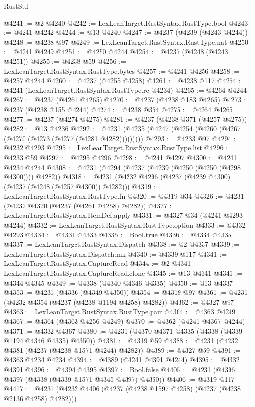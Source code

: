 \begin{lexlean}{RustStd}
\begin{coremodule}
@4241 := @2 @4240
@4242 := LexLeanTarget.RustSyntax.RustType.bool
@4243 := @4241 @4242
@4244 := @13 @4240
@4247 := @4237 (@4239 (@4243 @4244))
@4248 := @4238 @97
@4249 := LexLeanTarget.RustSyntax.RustType.nat
@4250 := @4241 @4249
@4251 := @4250 @4244
@4254 := @4237 (@4248 (@4243 @4251))
@4255 := @4238 @59
@4256 := LexLeanTarget.RustSyntax.RustType.bytes
@4257 := @4241 @4256
@4258 := @4257 @4244
@4260 := @4237 (@4255 @4258)
@4261 := @4238 @117
@4264 := @4241 (LexLeanTarget.RustSyntax.RustType.rc @4234)
@4265 := @4264 @4244
@4267 := @4237 (@4261 @4265)
@4270 := @4237 (@4238 @183 @4265)
@4273 := @4237 (@4238 @155 @4244)
@4274 := @4238 @364
@4275 := @4264 @4265
@4277 := @4237 (@4274 @4275)
@4281 := @4237 (@4238 @371 (@4257 @4275))
@4282 := @13 @4236
@4292 := @4231 (@4235 (@4247 (@4254 (@4260 (@4267 (@4270 (@4273 (@4277 (@4281 @4282)))))))))
@4293 := @4233 @97
@4294 := @4232 @4293
@4295 := LexLeanTarget.RustSyntax.RustType.list
@4296 := @4233 @59
@4297 := @4295 @4296
@4298 := @4241 @4297
@4300 := @4241 @4234 @4244
@4308 := @4231 (@4294 (@4237 (@4239 (@4250 (@4250 (@4298 @4300)))) @4282))
@4318 := @4231 (@4232 @4296 (@4237 (@4239 @4300) (@4237 (@4248 (@4257 @4300)) @4282)))
@4319 := LexLeanTarget.RustSyntax.RustType.fn
@4320 := @4319 @34
@4326 := @4231 (@4232 @4320 (@4237 (@4261 @4258) @4282))
@4327 := LexLeanTarget.RustSyntax.ItemDef.apply
@4331 := @4327 @34 (@4241 @4293 @4244)
@4332 := LexLeanTarget.RustSyntax.RustType.option
@4333 := @4332 @4293
@4334 := @4331 @4333
@4335 := Bool.true
@4336 := @4334 @4335
@4337 := LexLeanTarget.RustSyntax.Dispatch
@4338 := @2 @4337
@4339 := LexLeanTarget.RustSyntax.Dispatch.mk
@4340 := @4339 @117
@4341 := LexLeanTarget.RustSyntax.CaptureRead
@4344 := @2 @4341 LexLeanTarget.RustSyntax.CaptureRead.clone
@4345 := @13 @4341
@4346 := @4344 @4345
@4349 := @4338 (@4340 @4346 @4335)
@4350 := @13 @4337
@4353 := @4231 (@4336 (@4349 @4350))
@4354 := @4319 @97
@4361 := @4231 (@4232 @4354 (@4237 (@4238 @1194 @4258) @4282))
@4362 := @4327 @97
@4363 := LexLeanTarget.RustSyntax.RustType.pair
@4364 := @4363 @4249
@4367 := @4364 (@4363 @4256 @4249)
@4370 := @4362 (@4241 @4367 @4244)
@4371 := @4332 @4367
@4380 := @4231 (@4370 @4371 @4335 (@4338 (@4339 @1194 @4346 @4335) @4350))
@4381 := @4319 @59
@4388 := @4231 (@4232 @4381 (@4237 (@4238 @1571 @4244) @4282))
@4389 := @4327 @59
@4391 := @4363 @4234 @4234
@4394 := @4389 (@4241 @4391 @4244)
@4395 := @4332 @4391
@4396 := @4394 @4395
@4397 := Bool.false
@4405 := @4231 (@4396 @4397 (@4338 (@4339 @1571 @4345 @4397) @4350))
@4406 := @4319 @117
@4417 := @4231 (@4232 @4406 (@4237 (@4238 @1597 @4258) (@4237 (@4238 @2136 @4258) @4282)))

\end{coremodule}
\end{lexlean}
